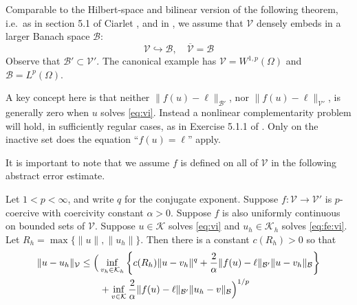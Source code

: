 \documentclass[hidelinks,onefignum,onetabnum,final]{siamart220329}  %
\newcommand{\cB}{\mathcal{B}}
\newcommand{\cK}{\mathcal{K}}
\newcommand{\cV}{\mathcal{V}}
\begin{document}
Comparable to the Hilbert-space and bilinear version of the following theorem, i.e.~as in section 5.1 of Ciarlet \cite{Ciarlet2002}, and in \cite{Falk1974}, we assume that $\cV$ densely embeds in a larger Banach space $\cB$:
\begin{equation}
\cV \hookrightarrow \cB, \quad \overline{\cV} = \cB
\end{equation}
Observe that $\cB' \subset \cV'$.  The canonical example has $\cV=W^{1,p}(\Omega)$ and $\cB=L^p(\Omega)$.

A key concept here is that neither $\|f(u)-\ell\|_{\cB'}$, nor $\|f(u)-\ell\|_{\cV'}$, is generally zero when $u$ solves \eqref{eq:vi}.  Instead a nonlinear complementarity problem will hold, in sufficiently regular cases, as in Exercise 5.1.1 of \cite{Ciarlet2002}.  Only on the inactive set does the equation ``$f(u)=\ell$'' apply.

It is important to note that we assume $f$ is defined on all of $\cV$ in the following abstract error estimate.

\begin{theorem} \label{thm:abstractestimate}
Let $1<p<\infty$, and write $q$ for the conjugate exponent.  Suppose $f:\cV \to \cV'$ is $p$-coercive with coercivity constant $\alpha>0$.  Suppose $f$ is also uniformly continuous on bounded sets of $\cV$.  Suppose $u\in\cK$ solves \eqref{eq:vi} and $u_h\in\cK_h$ solves \eqref{eq:fe:vi}.  Let $R_h=\max\{\|u\|,\|u_h\|\}$.  Then there is a constant $c(R_h)>0$ so that
\begin{align}
\|u-u_h\|_{\cV} &\le \Big(\inf_{v_h\in\cK_h} \left\{c(R_h) \|u - v_h\|^q + \frac{2}{\alpha} \|f(u)-\ell\|_{\cB'} \|u-v_h\|_{\cB}\right\} \label{eq:abstractestimate} \\
   &\qquad + \inf_{v\in\cK} \frac{2}{\alpha} \|f(u)-\ell\|_{\cB'} \|u_h-v\|_{\cB}\Big)^{1/p} \notag
\end{align}
\end{theorem}
\end{document}
